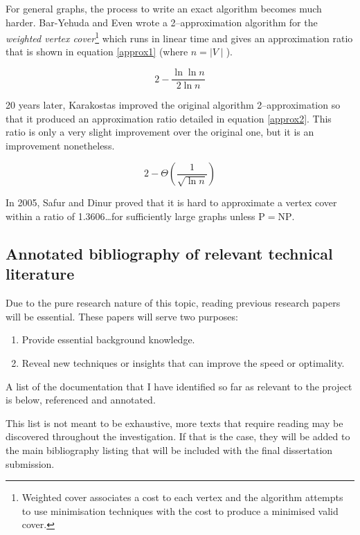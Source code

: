 \documentclass[11pt]{article}
\theoremstyle{definition}
\begin{document}
      For general graphs, the process to write an exact algorithm becomes much harder. Bar-Yehuda and Even \cite{YE}
      wrote a 2--approximation algorithm for the \emph{weighted vertex cover}\footnote{Weighted cover associates a cost to each vertex and the algorithm attempts to use minimisation techniques with the cost to produce a minimised valid cover.}
      which runs in linear time and gives an approximation ratio that is shown in equation \ref{approx1} (where $n = \mid V\mid$).

      \begin{equation} \label{approx1}
        2 - \frac{\ln \ln n}{2 \ln n}
      \end{equation}
      
      20 years later, Karakostas \cite{Krak} improved the original algorithm 2--approximation so that it produced
      an approximation ratio detailed in equation \ref{approx2}. This ratio is only a very slight improvement over the
      original one, but it is an improvement nonetheless. 
 
      \begin{equation} \label{approx2}
        2 - \Theta(\frac{1}{\sqrt{\ln n}})
      \end{equation}
 
      In 2005, Safur and Dinur \cite{SafD} proved that it is hard to approximate a vertex cover within a ratio
      of 1.3606\ldots for sufficiently large graphs unless $\mathrm{P} = \mathrm{NP}$.     

    \subsection{Annotated bibliography of relevant technical literature}
      Due to the pure research nature of this topic, reading previous research papers will be essential.
      These papers will serve two purposes:
      \begin{enumerate}
        \item Provide essential background knowledge.
        \item Reveal new techniques or insights that can improve the speed or optimality. 
      \end{enumerate}
      A list of the documentation that I have identified so far as relevant to the project is below, referenced
      and annotated.

      This list is not meant to be exhaustive, more texts that require reading may be discovered throughout the investigation.
      If that is the case, they will be added to the main bibliography listing that will be included with the final
      dissertation submission.   
        
\end{document}
